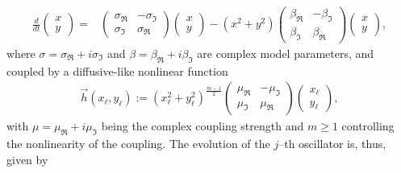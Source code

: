 \documentclass[aps,showpacs,preprintnumbers,amsmath,amssymb,twocolumn,superscriptaddress,floatfix,nofootinbib,10pt,pre]{revtex4-1}
\begin{document}
\begin{align}\label{eq:SLapp}
\frac{d}{dt}
\begin{pmatrix}
 x\\y
\end{pmatrix} =&
\begin{pmatrix}
 \sigma_{\Re} & -\sigma_{\Im}\\
 \sigma_{\Im} & \sigma_{\Re}
\end{pmatrix}
\begin{pmatrix}
 x\\y
\end{pmatrix}-  (x^2+y^2)
\begin{pmatrix}
 \beta_{\Re} & -\beta_{\Im}\\
 \beta_{\Im} & \beta_{\Re}
\end{pmatrix}
\begin{pmatrix}
 x\\y
\end{pmatrix},
\end{align}
where $\sigma=\sigma_{\Re}+i\sigma_{\Im}$ and $\beta=\beta_{\Re}+i\beta_{\Im}$ are complex model parameters, and coupled by a diffusive-like nonlinear function
\begin{align}
    \vec{h}(x_\ell,y_\ell):=(x_\ell^2+y_\ell^2)^{\frac{m-1}{2}}
\begin{pmatrix}
 \mu_{\Re} & -\mu_{\Im}\\
 \mu_{\Im} & \mu_{\Re}
\end{pmatrix}
\begin{pmatrix}
 x_\ell\\y_\ell
\end{pmatrix},
\end{align}
with $\mu=\mu_{\Re}+i\mu_{\Im}$ being the complex coupling strength and $m\ge 1$ controlling the nonlinearity of the coupling. The evolution of the $j$--th oscillator is, thus, given by
\end{document}
